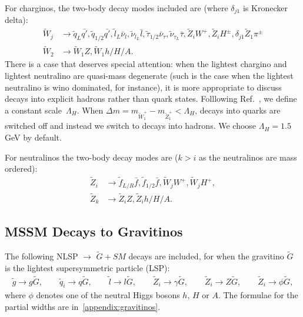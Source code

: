 \documentclass[final,3p,times]{elsarticle}
\begin{document}
For charginos, the two-body decay modes included are (where $\delta_{j1}$ is
Kronecker delta):
\begin{align*}
\tilde{W}_{j} &\rightarrow \tilde{q}_L \bar{q'}, \tilde{q}_{1/2} \bar{q'},
                \tilde{l}_L \bar{\nu}_{l}, \tilde{\nu}_{{l}_{L}} \bar{l},
                \tilde{\tau}_{1/2} \bar{\nu}_{\tau}, \tilde{\nu}_{{\tau}_{L}}
                \bar{\tau},  \tilde{Z}_{i} W^+, \tilde{Z}_{i} H^\pm,
                \delta_{j1}\tilde{Z}_1 \pi^\pm  \\
\tilde{W}_{2} &\rightarrow \tilde{W}_{1} Z, \tilde{W}_{1} h/H/A.
\end{align*}
There is a case that deserves special attention: when the lightest
chargino and lightest neutralino are quasi-mass degenerate (such is the case
when the lightest neutralino is wino dominated, for instance), it is more
appropriate to discuss decays into explicit hadrons rather than quark states. 
Folllowing Ref.~\cite{gunionetal}, we define a constant
scale~$\Lambda_H$. When $\Delta m=m_{{\tilde W}_1^+} - m_{{\tilde 
    Z}_1^+} < \Lambda_H$, decays into quarks are switched off and 
instead we switch to decays into hadrons. We choose $\Lambda_H=1.5$
GeV by default. 


For neutralinos the two-body decay modes are ($k>i$ as the neutralinos
are mass ordered): 
\begin{align*}
\tilde{Z}_{i} &\rightarrow \tilde{f}_{L/R} \bar{f}, \tilde{f}_{1/2} \bar{f}, \tilde{W}_{j} W^+, \tilde{W}_{j} H^+,\\
\tilde{Z}_{k} &\rightarrow \tilde{Z}_{i} Z, \tilde{Z}_i h/H/A.
\end{align*}

\subsection{MSSM Decays to Gravitinos}
The following NLSP $\rightarrow$ $\tilde{G} + SM$ decays are included,
for when the gravitino $\tilde{G}$ is the lightest supersymmetric particle
(LSP):
\begin{align*}
\tilde{g} \rightarrow g \tilde{G}, \qquad
\tilde{q}_{i} \rightarrow q \tilde{G}, \qquad
\tilde{l} \rightarrow l \tilde{G}, \qquad
\tilde{Z}_{i} \rightarrow \gamma \tilde{G}, \qquad
\tilde{Z}_{i} \rightarrow Z \tilde{G}, \qquad
\tilde{Z}_{i} \rightarrow \phi \tilde{G},
\end{align*}
where $\phi$ denotes one of the neutral Higgs bosons $h$, $H$ or $A$.
The formulae for the partial widths are in~\ref{appendix:gravitinos}.
\end{document}
